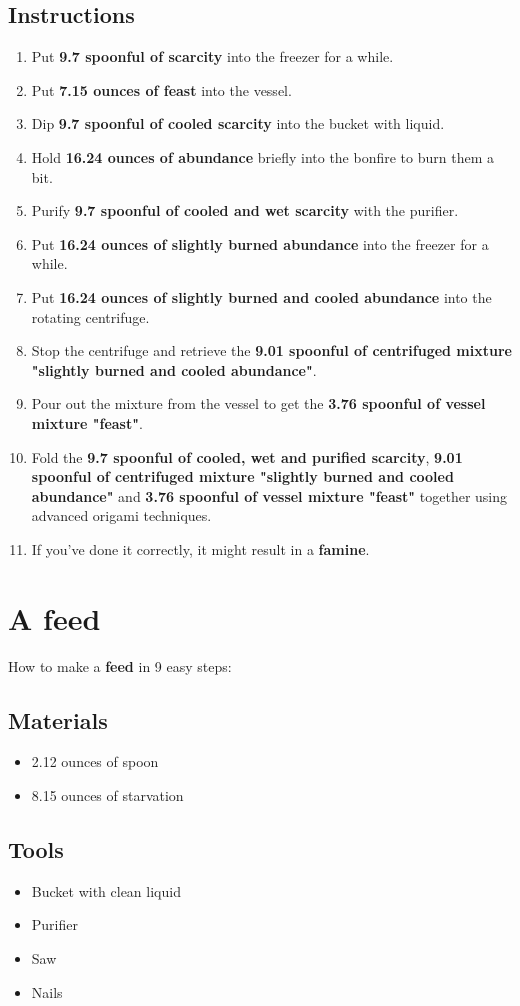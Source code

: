 \documentclass{article}
\begin{document}
\subsection{Instructions}\begin{enumerate}
\item 
Put \textbf{9.7 spoonful of scarcity} into the freezer for a while.
\item 
Put \textbf{7.15 ounces of feast} into the vessel.
\item 
Dip \textbf{9.7 spoonful of cooled scarcity} into the bucket with liquid.
\item 
Hold \textbf{16.24 ounces of abundance} briefly into the bonfire to burn them a bit.
\item 
Purify \textbf{9.7 spoonful of cooled and wet scarcity} with the purifier.
\item 
Put \textbf{16.24 ounces of slightly burned abundance} into the freezer for a while.
\item 
Put \textbf{16.24 ounces of slightly burned and cooled abundance} into the rotating centrifuge.
\item 
Stop the centrifuge and retrieve the \textbf{9.01 spoonful of centrifuged mixture "slightly burned and cooled abundance"}.
\item 
Pour out the mixture from the vessel to get the \textbf{3.76 spoonful of vessel mixture "feast"}.
\item 
Fold the \textbf{9.7 spoonful of cooled, wet and purified scarcity}, \textbf{9.01 spoonful of centrifuged mixture "slightly burned and cooled abundance"} and \textbf{3.76 spoonful of vessel mixture "feast"} together using advanced origami techniques.
\item 
If you've done it correctly, it might result in a \textbf{famine}.
\end{enumerate}
\newpage
\section{A feed}How to make a \textbf{feed} in 9 easy steps:

\subsection{Materials}\begin{itemize}
\item 
2.12 ounces of spoon
\item 
8.15 ounces of starvation
\end{itemize}
\subsection{Tools}\begin{itemize}
\item 
Bucket with clean liquid
\item 
Purifier
\item 
Saw
\item 
Nails
\end{itemize}
\end{document}
